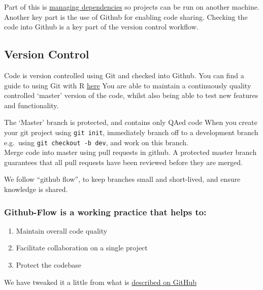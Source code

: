 \documentclass[]{book}
\providecommand{\tightlist}{%
  \setlength{\itemsep}{0pt}\setlength{\parskip}{0pt}}
\begin{document}
Part of this is \protect\hyperlink{projdep}{managing dependencies} so projects can be run on another machine. Another key part is the use of Github for enabling code sharing. Checking the code into Github is a key part of the version control workflow.

\hypertarget{versioncontrol}{%
\subsection{Version Control}\label{versioncontrol}}

Code is version controlled using Git and checked into Github.
You can find a guide to using Git with R \href{http://happygitwithr.com/}{here}
You are able to maintain a continuously quality controlled `master' version of the code, whilst also being able to test new features and functionality.

The `Master' branch is protected, and contains only QAed code
When you create your git project using \texttt{git\ init}, immediately branch off to a development branch e.g.~using \texttt{git\ checkout\ -b\ dev}, and work on this branch.\\
Merge code into master using pull requests in github. A protected master branch guarantees that all pull requests have been reviewed before they are merged.

We follow ``github flow'', to keep branches small and short-lived, and ensure knowledge is shared.

\hypertarget{github-flow-is-a-working-practice-that-helps-to}{%
\subsubsection*{Github-Flow is a working practice that helps to:}\label{github-flow-is-a-working-practice-that-helps-to}}

\begin{enumerate}
\def\labelenumi{\arabic{enumi}.}
\tightlist
\item
  Maintain overall code quality\\
\item
  Facilitate collaboration on a single project\\
\item
  Protect the codebase
\end{enumerate}

We have tweaked it a little from what is \href{https://guides.github.com/introduction/flow/}{described on GitHub}
\end{document}
